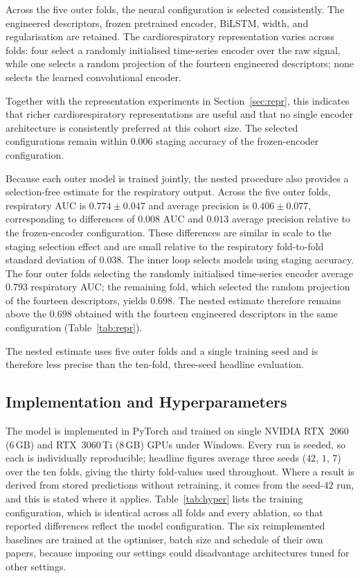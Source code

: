\documentclass[a4paper,fleqn]{cas-sc}
\begin{document}
Across the five outer folds, the neural configuration is selected consistently. The engineered descriptors, frozen pretrained encoder, BiLSTM, width, and
regularisation are retained. The cardiorespiratory representation varies across
folds: four select a randomly initialised time-series encoder over the raw signal,
while one selects a random projection of the fourteen engineered descriptors;
none selects the learned convolutional encoder.

Together with the representation experiments in Section~\ref{sec:repr}, this indicates that richer cardiorespiratory representations are useful and that no single encoder architecture is consistently preferred at this cohort size.
The selected configurations remain within $0.006$ staging accuracy of the frozen-encoder configuration.

Because each outer model is trained jointly, the nested procedure also provides a
selection-free estimate for the respiratory output. Across the five outer folds, respiratory AUC is $0.774 \pm 0.047$ and average precision is $0.406 \pm 0.077$, corresponding to differences of $0.008$ AUC and $0.013$ average precision relative to the frozen-encoder configuration.
These differences are similar in scale to the staging selection effect and are small relative
to the respiratory fold-to-fold standard deviation of $0.038$. The inner loop selects models
using staging accuracy. The four outer folds selecting the randomly initialised time-series
encoder average $0.793$ respiratory AUC; the remaining fold, which selected the random
projection of the fourteen descriptors, yields $0.698$. The nested estimate therefore
remains above the $0.698$ obtained with the fourteen engineered descriptors in the same
configuration (Table~\ref{tab:repr}).

The nested estimate uses five outer folds and a single training seed and is therefore less precise than the ten-fold, three-seed headline evaluation.

\subsection{Implementation and Hyperparameters}
The model is implemented in PyTorch and trained on single NVIDIA RTX~2060 (6\,GB) and
RTX~3060\,Ti (8\,GB) GPUs under Windows. Every run is seeded, so each is individually reproducible; headline figures
average three seeds ($42$, $1$, $7$) over the ten folds, giving the thirty fold-values used
throughout. Where a result is derived from stored predictions without retraining, it comes from the seed-$42$ run, and this is stated where it applies.
Table~\ref{tab:hyper} lists the training configuration, which is identical across all folds and every ablation, so that reported differences reflect the model configuration. The six reimplemented baselines are trained at the optimiser, batch size and schedule of their own papers, because imposing our settings could disadvantage architectures tuned for other settings.
\end{document}
